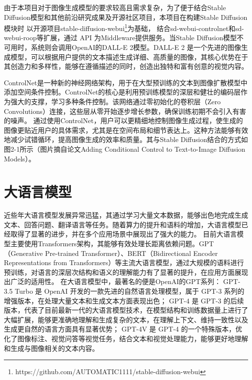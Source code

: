 \documentclass[a4paper,AutoFakeBold,oneside,12pt]{book}
\begin{document}
由于本项目对于图像生成模型的要求较高且需求复杂，为了便于结合Stable Diffusion模型和其他前沿研究成果及开源社区项目，本项目在构建Stable Diffusion模块时
以开源项目stable-diffusion-webui\footnote{https://github.com/AUTOMATIC1111/stable-diffusion-webui}为基础，
结合sd-webui-controlnet和sd-webui-roop等扩展，通过 API 为Middleware提供服务。当Stable Diffusion模型不可用时，系统则会调用OpenAI的DALL-E 2模型。DALL-E 2 是一个先进的图像生成模型，可以根据用户提供的文本描述生成详细、高质量的图像，其核心优势在于其创造力和多样性，能够在遵循描述的同时，创造出独特和富有创意的视觉内容。

ControlNet\cite{zhang2023adding}是一种新的神经网络架构，用于在大型预训练的文本到图像扩散模型中添加空间条件控制。ControlNet的核心是利用预训练模型的深层和健壮的编码层作为强大的支撑，学习多种条件控制。该网络通过零初始化的卷积层（Zero Convolutions）连接，这些层从零开始逐步增长参数，确保训练初期不会引入有害的噪声。
通过使用ControlNet，用户可以更精细地控制图像生成过程，使生成的图像更贴近用户的具体需求，尤其是在空间布局和细节表达上。这种方法能够有效地减少试错循环，提高图像生成的效率和质量。其与Stable Diffusion结合的方式如图2-1所示（图片摘自论文Adding Conditional Control to Text-to-Image Diffusion Models\cite{zhang2023adding}）。




\section{大语言模型}
近些年大语言模型发展异常迅猛，其通过学习大量文本数据，能够出色地完成生成文本、回答问题、翻译语言等任务。随着算力的提升和语料的增加，大语言模型已经取得了显著的进步，并在多个应用场景中展现出了强大的能力。
目前大语言模型主要使用Transformers\cite{vaswani2017attention}架构，其能够有效处理长距离依赖问题。GPT（Generative Pre-trained Transformer）、BERT（Bidirectional Encoder Representations from Transformers）等主流大语言模型，通过大规模的语料进行预训练，对语言的深层次结构和语义的理解能力有了显著的提升，在应用方面展现出广泛的适用性。
在大语言模型中，最著名的便是OpenAI的GPT系列：
GPT-3.5 Turbo 是 OpenAI 开发的一款先进的自然语言处理模型，属于 GPT-3 系列的增强版本，在处理大量文本和生成文本方面表现出色；
GPT-4\cite{achiam2023gpt} 是 GPT-3 的后续版本，代表了目前最新一代的大语言模型技术，在模型结构和训练数据量上进行了大幅扩展，能够更准确地理解和生成复杂的文本，在理解上下文、维持一致性以及生成更自然的语言方面具有显著优势；
GPT-4V 是 GPT-4 的一个特殊版本，优化了图像标注、视觉问答等视觉任务，结合文本和视觉处理能力，能够更好地理解和生成与图像相关的文本内容。
\end{document}
